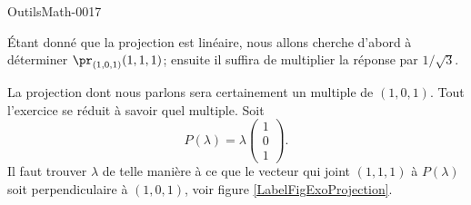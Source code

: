 
\begin{corrige}{OutilsMath-0017}



	\newcommand{\CaptionFigExoProjection}{Pour l'exercice \ref{exoOutilsMath-0017}. À partir du point $A$, il faut trouver quel vecteur tombe perpendiculairement à la droite contenant $w$.}


Étant donné que la projection est linéaire, nous allons cherche d'abord à déterminer \( \pr_{(1,0,1)}(1,1,1)\); ensuite il suffira de multiplier la réponse par \( 1/\sqrt{3}\).

	La projection dont nous parlons sera certainement un multiple de $(1,0,1)$. Tout l'exercice se réduit à savoir quel multiple. Soit
	\begin{equation}
		P(\lambda)=\lambda\begin{pmatrix}
			1	\\ 
			0	\\ 
			1	
		\end{pmatrix}.
	\end{equation}
	Il faut trouver $\lambda$ de telle manière à ce que le vecteur qui joint $(1,1,1)$ à $P(\lambda)$ soit perpendiculaire à $(1,0,1)$, voir figure \ref{LabelFigExoProjection}.
	

\end{corrige}
